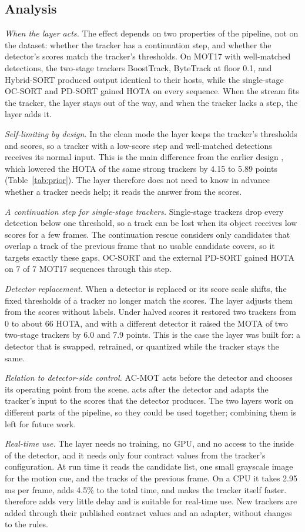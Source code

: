 \subsection{Analysis}\label{sec:discussion}

\emph{When the layer acts.} The effect depends on two properties of the
pipeline, not on the dataset: whether the tracker has a continuation step,
and whether the detector's scores match the tracker's thresholds. On MOT17
with well-matched detections, the two-stage trackers BoostTrack, ByteTrack at
floor 0.1, and Hybrid-SORT produced output identical to their hosts, while
the single-stage OC-SORT and PD-SORT gained HOTA on every sequence. When the
stream fits the tracker, the layer stays out of the way, and when the
tracker lacks a step, the layer adds it.

\emph{Self-limiting by design.} In the clean mode the layer keeps the
tracker's thresholds and scores, so a tracker with a low-score step and
well-matched detections receives its normal input. This is the main
difference from the earlier design \aob{}, which lowered the HOTA of the same
strong trackers by 4.15 to 5.89 points (Table~\ref{tab:prior}). The layer
therefore does not need to know in advance whether a tracker needs help; it
reads the answer from the scores.

\emph{A continuation step for single-stage trackers.} Single-stage trackers
drop every detection below one threshold, so a track can be lost when its
object receives low scores for a few frames. The continuation rescue
considers only candidates that overlap a track of the previous frame that no
usable candidate covers, so it targets exactly these gaps. OC-SORT and the
external PD-SORT gained HOTA on 7 of 7 MOT17 sequences through this step.

\emph{Detector replacement.} When a detector is replaced or its score scale
shifts, the fixed thresholds of a tracker no longer match the scores. The
layer adjusts them from the scores without labels. Under halved scores it
restored two trackers from 0 to about 66 HOTA, and with a different detector
it raised the MOTA of two two-stage trackers by 6.0 and 7.9 points. This is
the case the layer was built for: a detector that is swapped, retrained, or
quantized while the tracker stays the same.

\emph{Relation to detector-side control.} AC-MOT \cite{ismail2026acmot} acts
before the detector and chooses its operating point from the scene. \scl{}
acts after the detector and adapts the tracker's input to the scores that the
detector produces. The two layers work on different parts of the pipeline,
so they could be used together; combining them is left for future work.

\emph{Real-time use.} The layer needs no training, no GPU, and no access to
the inside of the detector, and it needs only four contract values from the
tracker's configuration. At run time it reads the candidate list, one small
grayscale image for the motion cue, and the tracks of the previous frame. On
a CPU it takes 2.95 ms per frame, adds 4.5\% to the total time, and makes the
tracker itself faster. \scl{} therefore adds very little delay and is
suitable for real-time use. New trackers are added through their published
contract values and an adapter, without changes to the rules.
